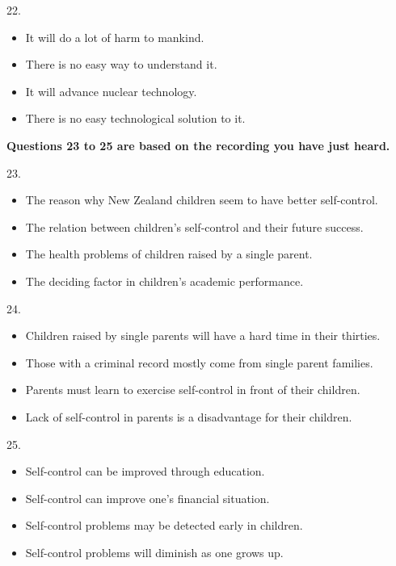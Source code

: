 \documentclass[UTF8,11pt]{ctexart}
\begin{document}
22.


\begin{itemize}[leftmargin=2em,itemsep=.2em,topsep=.4em]\item[A.] It will do a lot of harm to mankind.
\item[B.] There is no easy way to understand it.
\item[C.] It will advance nuclear technology.
\item[D.] There is no easy technological solution to it.
\end{itemize}

\textbf{Questions 23 to 25 are based on the recording you have just heard.}


23.


\begin{itemize}[leftmargin=2em,itemsep=.2em,topsep=.4em]\item[A.] The reason why New Zealand children seem to have better self-control.
\item[B.] The relation between children's self-control and their future success.
\item[C.] The health problems of children raised by a single parent.
\item[D.] The deciding factor in children's academic performance.
\end{itemize}

24.


\begin{itemize}[leftmargin=2em,itemsep=.2em,topsep=.4em]\item[A.] Children raised by single parents will have a hard time in their thirties.
\item[B.] Those with a criminal record mostly come from single parent families.
\item[C.] Parents must learn to exercise self-control in front of their children.
\item[D.] Lack of self-control in parents is a disadvantage for their children.
\end{itemize}

25.


\begin{itemize}[leftmargin=2em,itemsep=.2em,topsep=.4em]\item[A.] Self-control can be improved through education.
\item[B.] Self-control can improve one's financial situation.
\item[C.] Self-control problems may be detected early in children.
\item[D.] Self-control problems will diminish as one grows up.
\end{itemize}
\end{document}
